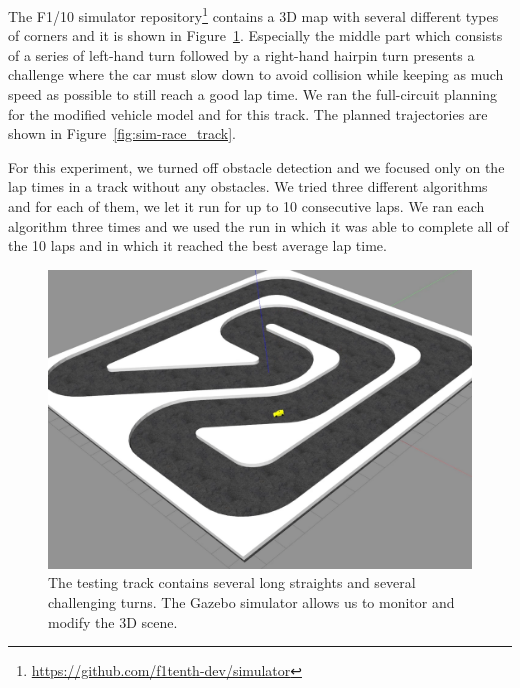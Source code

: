 The F1/10 simulator repository\footnote{\url{https://github.com/f1tenth-dev/simulator}} contains a 3D map with several different types of corners and it is shown in Figure~\ref{fig:gazebo-track}. Especially the middle part which consists of a series of left-hand turn followed by a right-hand hairpin turn presents a challenge where the car must slow down to avoid collision while keeping as much speed as possible to still reach a good lap time. We ran the full-circuit planning for the modified vehicle model and for this track. The planned trajectories are shown in Figure~\ref{fig:sim-race_track}.

For this experiment, we turned off obstacle detection and we focused only on the lap times in a track without any obstacles. We tried three different algorithms and for each of them, we let it run for up to 10 consecutive laps. We ran each algorithm three times and we used the run in which it was able to complete all of the 10 laps and in which it reached the best average lap time.

\begin{figure}
	\label{fig:gazebo-track}
	\centering
	\includegraphics[width=\textwidth]{../img/experiments/gazebo-track.png}
	\caption{The testing track contains several long straights and several challenging turns. The Gazebo simulator allows us to monitor and modify the 3D scene.}
\end{figure}


